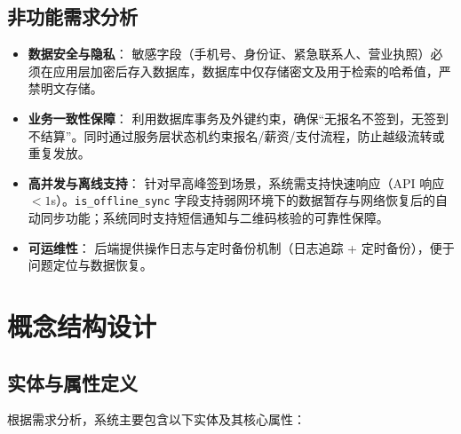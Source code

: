 \documentclass[UTF8,a4paper,12pt]{article}
\begin{document}
\subsection{非功能需求分析}
\begin{itemize}
    \item \textbf{数据安全与隐私}：
    敏感字段（手机号、身份证、紧急联系人、营业执照）必须在应用层加密后存入数据库，数据库中仅存储密文及用于检索的哈希值，严禁明文存储。
    
    \item \textbf{业务一致性保障}：
    利用数据库事务及外键约束，确保“无报名不签到，无签到不结算”。同时通过服务层状态机约束报名/薪资/支付流程，防止越级流转或重复发放。
    
    \item \textbf{高并发与离线支持}：
    针对早高峰签到场景，系统需支持快速响应（API 响应 $<1$s）。\texttt{is\_offline\_sync} 字段支持弱网环境下的数据暂存与网络恢复后的自动同步功能；系统同时支持短信通知与二维码核验的可靠性保障。
    
    \item \textbf{可运维性}：
    后端提供操作日志与定时备份机制（日志追踪 + 定时备份），便于问题定位与数据恢复。
\end{itemize}

\section{概念结构设计}

\subsection{实体与属性定义}
根据需求分析，系统主要包含以下实体及其核心属性：
\end{document}
